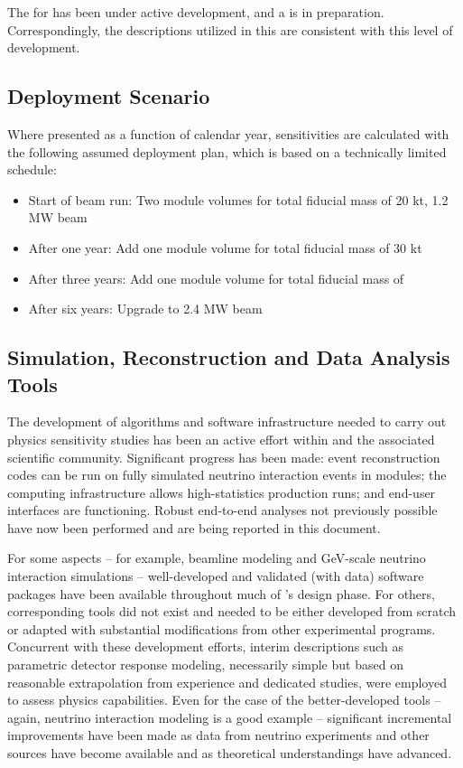 The  for  has been under active development,
and a  is in preparation.
Correspondingly, the descriptions utilized in this 
are consistent with this level of development.  

\subsection{Deployment Scenario}
\label{sec:exec-phys-assm-meth-deployment}

Where presented as a function of calendar year,
sensitivities are calculated with the following
assumed deployment plan, which is based on a
technically limited schedule:
\begin{itemize}
    \item Start of beam run: Two  module %
    volumes for total fiducial mass of 20 kt, 1.2 MW beam
    \item After one year: Add one  module  volume for total fiducial mass of 30 kt
    \item After three years: Add one  module  volume for total fiducial mass of \fdfiducialmass
    \item After six years: Upgrade to 2.4 MW beam
\end{itemize}


\subsection{Simulation, Reconstruction and Data Analysis Tools}
\label{sec:exec-phys-assm-meth-simreco}

The development of algorithms and software infrastructure needed
to carry out physics sensitivity studies has been an active 
effort within  and the associated scientific community.  
Significant progress has been made: event reconstruction 
codes can be run on fully simulated neutrino interaction events 
in   modules; the  computing infrastructure 
allows high-statistics production runs; and end-user interfaces 
are functioning.  Robust end-to-end analyses not previously
possible have now been performed and are being 
reported in this document.

For some aspects -- for example, beamline modeling
and GeV-scale neutrino interaction simulations --
well-developed and validated (with data) software packages have
been available throughout much of 's design phase.
For others, corresponding tools did not exist and needed to be
either developed from scratch or adapted with substantial
modifications from other experimental programs.  Concurrent
with these development efforts, interim descriptions such
as parametric detector response modeling, necessarily simple
but based on reasonable extrapolation from experience and
dedicated studies, were employed to assess physics capabilities.
Even for the case of the better-developed tools -- again, neutrino 
interaction modeling is a good example -- significant incremental
improvements have been made as data from neutrino experiments
and other sources have become available and as theoretical
understandings have advanced.

